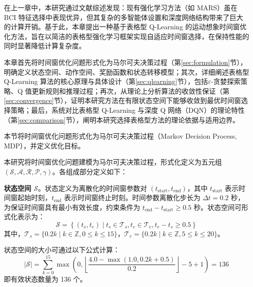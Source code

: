 
\label{chap:method}

在上一章中，本研究通过文献综述发现：现有强化学习方法（如 MARS）虽在 BCI 特征选择中表现优异，但其复杂的多智能体设置和深度网络结构带来了巨大的计算开销。基于此，本章提出一种基于表格型 Q-Learning 的运动想象时间窗优化方法，旨在以简洁的表格型强化学习框架实现自适应时间窗选择，在保持性能的同时显著降低计算复杂度。

本章首先将时间窗优化问题形式化为马尔可夫决策过程（第\ref{sec:formulation}节），明确定义状态空间、动作空间、奖励函数和状态转移模型；其次，详细阐述表格型 Q-Learning 算法的核心原理与具体设计（第\ref{sec:qlearning}节），包括$\varepsilon$-贪婪探索策略、Q 值更新规则和推理过程；再次，从理论上分析算法的收敛性保证（第\ref{sec:convergence}节），证明本研究方法在有限状态空间下能够收敛到最优时间窗选择策略；最后，系统对比表格型 Q-Learning 与深度 Q 网络（DQN）的理论特性（第\ref{sec:comparison}节），阐明本研究选择表格型方法的理论依据与适用边界。

\label{sec:formulation}

本节将时间窗优化问题形式化为马尔可夫决策过程（Markov Decision Process, MDP），并定义优化目标。

\label{subsec:mdp}

本研究将时间窗优化问题建模为马尔可夫决策过程，形式化定义为五元组 $(\mathcal{S}, \mathcal{A}, \mathcal{R}, \mathcal{P}, \gamma)$。各组成部分定义如下：

\textbf{状态空间 $\mathcal{S}$}。状态定义为离散化的时间窗参数对 $(t_{\text{start}}, t_{\text{end}})$，其中 $t_{\text{start}}$ 表示时间窗起始时刻，$t_{\text{end}}$ 表示时间窗终止时刻。时间参数离散化步长为 $\Delta t = 0.2$ 秒，为保证时间窗具有最小有效长度，约束条件为 $t_{\text{end}} - t_{\text{start}} \geq 0.5$ 秒。状态空间可形式化表示为：
\begin{equation}
\mathcal{S} = \left\{ (t_s, t_e) \mid t_s \in \mathcal{T}_s, t_e \in \mathcal{T}_e, t_e - t_s \geq 0.5 \right\}
\end{equation}
其中，$\mathcal{T}_s = \{0.2k \mid k \in \mathbb{Z}, 0 \leq k \leq 15\}$，$\mathcal{T}_e = \{0.2k \mid k \in \mathbb{Z}, 5 \leq k \leq 20\}$。

状态空间的大小可通过以下公式计算：
\begin{equation}
|\mathcal{S}| = \sum_{k=0}^{15} \max\left(0, \left\lfloor \frac{4.0 - \max(1.0, 0.2k + 0.5)}{0.2} \right\rfloor - 5 + 1\right) = 136
\end{equation}
即有效状态数量为 136 个。

